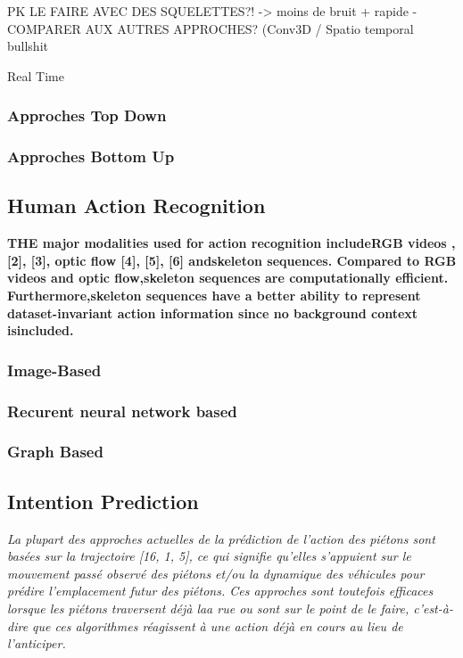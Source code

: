 PK LE FAIRE AVEC DES SQUELETTES?! -> moins de bruit + rapide
-COMPARER AUX AUTRES APPROCHES? (Conv3D / Spatio temporal bullshit

Real Time

\label{subsec:SQUEL}
\subsubsection{Approches Top Down}
\subsubsection{Approches Bottom Up}

\subsection{Human Action Recognition}
\textbf{THE major modalities used for action recognition includeRGB  videos  \cite{donahue2015long},  [2],  [3],  optic  flow  [4],  [5],  [6]  andskeleton sequences. Compared to RGB videos and optic flow,skeleton sequences are computationally efficient. Furthermore,skeleton  sequences  have  a  better  ability  to  represent  dataset-invariant  action  information  since  no  background  context  isincluded.}

\label{subsec:HAR}

\subsubsection{Image-Based}
\subsubsection{Recurent neural network based}
\subsubsection{Graph Based}

\subsection{Intention Prediction}
\textit{La plupart des approches actuelles de la prédiction de l'action des piétons sont basées sur la trajectoire [16, 1, 5], ce qui signifie qu'elles s'appuient sur le mouvement passé observé des piétons et/ou la dynamique des véhicules pour prédire l'emplacement futur des piétons. Ces approches sont toutefois efficaces lorsque les piétons traversent déjà laa rue ou sont sur le point de le faire, c'est-à-dire que ces algorithmes réagissent à une action déjà en cours au lieu de l'anticiper.}

